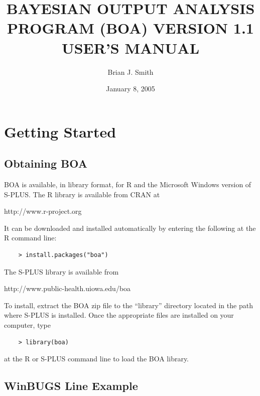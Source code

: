 \documentclass[12pt,letterpaper]{report}
\begin{document}
\title{BAYESIAN OUTPUT ANALYSIS PROGRAM (BOA) VERSION 1.1 USER'S MANUAL}
\author{Brian J. Smith}
\date{January 8, 2005}
\maketitle

\tableofcontents


\chapter{Getting Started}
\noindent


\section{Obtaining BOA}
\noindent BOA is available, in library format, for R and the
Microsoft Windows version of S-PLUS.  The R library is available
from CRAN at
\begin{center}
http://www.r-project.org
\end{center}
It can be downloaded and installed automatically by entering the
following at the R command line:
\begin{small}
\begin{verbatim}
    > install.packages("boa")
\end{verbatim}
\end{small}
The S-PLUS library is available from
\begin{center}
http://www.public-health.uiowa.edu/boa
\end{center}
To install, extract the BOA zip file to the ``library'' directory
located in the path where S-PLUS is installed.  Once the
appropriate files are installed on your computer, type
\begin{small}
\begin{verbatim}
    > library(boa)
\end{verbatim}
\end{small}
at the R or S-PLUS command line to load the BOA library.


\section{WinBUGS Line Example}
\end{document}
